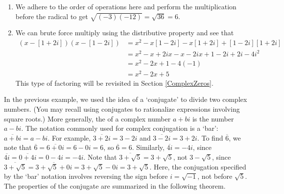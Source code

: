 {\begin{enumerate}
\item  We adhere to the order of operations here and perform the multiplication before the radical to get  $\sqrt{(-3)(-12)} = \sqrt{36} = 6$. 

\item  We can brute force multiply using the distributive property and see that 
\begin{align*}
(x-[1+2i])(x-[1-2i]) & =  x^2 -x[1-2i]-x[1+2i]+[1-2i][1+2i]  \\
					 & =  x^2-x+2ix-x-2ix+1-2i+2i-4i^2   \\
					 & =  x^2-2x + 1-4(-1) \\
					 & =  x^2 -2x +5 
\end{align*}
This type of factoring will be revisited in Section \ref{ComplexZeros}. 

\end{enumerate}
}

\medskip

In the previous example, we used the idea of a `conjugate' to divide two complex numbers. (You may recall using conjugates to rationalize expressions involving square roots.)  More generally, the  of a complex number $a+bi$ is the number $a-bi$.  The notation commonly used for complex conjugation is a `bar':  $\overline{a+bi} = a-bi$. For example, $\overline{3+2i} = 3-2i$ and $\overline{3-2i} = 3+2i$. To find $\overline{6}$, we note that $\overline{6} = \overline{6+0i}= 6 - 0i = 6$, so $\overline{6} = 6$. Similarly, $\overline{4i} = -4i$, since $\overline{4i} = \overline{0 + 4i} = 0 - 4i =  -4i$.  Note that $\overline{3+\sqrt{5}} = 3 + \sqrt{5}$, not $3 - \sqrt{5}$, since  $\overline{3+\sqrt{5}} = \overline{3+\sqrt{5} + 0i} = 3+\sqrt{5}  - 0i = 3+\sqrt{5}$. Here, the conjugation specified by the `bar' notation involves reversing the sign before $i = \sqrt{-1}$, not before  $\sqrt{5}$.  The properties of the conjugate are summarized in the following theorem.

\medskip


